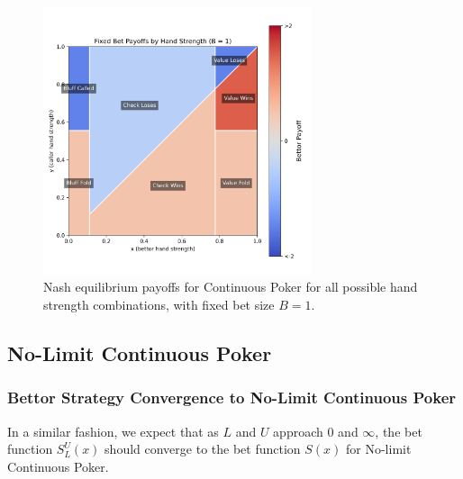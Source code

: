 \documentclass[a4paper,12pt]{article}
\theoremstyle{plain}
\theoremstyle{definition}
\begin{document}
\begin{figure}[h!]
    \centering
    \includegraphics[width=0.7\textwidth]{payoff_fixed_bet_heatmap.png}
    \caption{Nash equilibrium payoffs for Continuous Poker for all possible hand strength combinations, with fixed bet size $B=1$.}
    \label{fig:payoff}
\end{figure}


\subsection{No-Limit Continuous Poker}

\subsubsection{Bettor Strategy Convergence to No-Limit Continuous Poker}

In a similar fashion, we expect that as $L$ and $U$ approach $0$ and $\infty$, the bet function $S_L^U(x)$ should converge to the bet function $S(x)$ for No-limit Continuous Poker.
\end{document}
